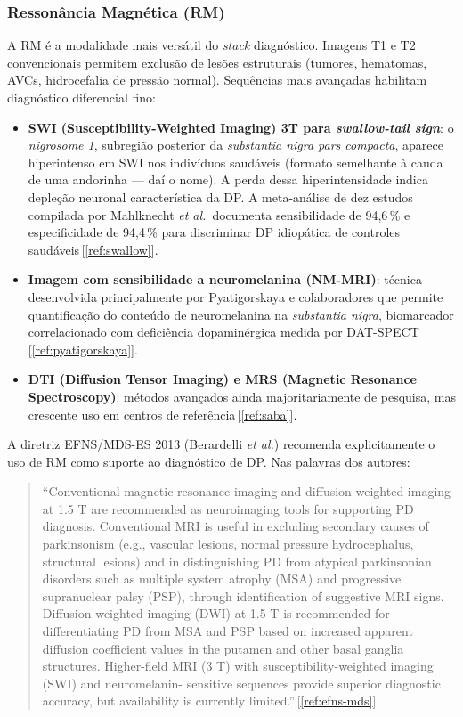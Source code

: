 \documentclass[12pt,a4paper,oneside]{article}
\begin{document}
\subsubsection{Ressonância Magnética (RM)}

A RM é a modalidade mais versátil do \textit{stack} diagnóstico.
Imagens T1 e T2 convencionais permitem exclusão de lesões
estruturais (tumores, hematomas, AVCs, hidrocefalia de pressão
normal). Sequências mais avançadas habilitam diagnóstico
diferencial fino:

\begin{itemize}
\item \textbf{SWI (Susceptibility-Weighted Imaging) 3T para
\textit{swallow-tail sign}}: o \textit{nigrosome 1}, subregião
posterior da \textit{substantia nigra pars compacta}, aparece
hiperintenso em SWI nos indivíduos saudáveis (formato semelhante
à cauda de uma andorinha — daí o nome). A perda dessa
hiperintensidade indica depleção neuronal característica da DP. A
meta-análise de dez estudos compilada por Mahlknecht \textit{et al.}\
documenta sensibilidade de 94,6\,\% e especificidade de 94,4\,\%
para discriminar DP idiopática de controles
saudáveis\,[\ref{ref:swallow}].
\item \textbf{Imagem com sensibilidade a neuromelanina
(NM-MRI)}: técnica desenvolvida principalmente por Pyatigorskaya e
colaboradores que permite quantificação do conteúdo de neuromelanina
na \textit{substantia nigra}, biomarcador correlacionado com
deficiência dopaminérgica medida por
DAT-SPECT\,[\ref{ref:pyatigorskaya}].
\item \textbf{DTI (Diffusion Tensor Imaging) e MRS (Magnetic
Resonance Spectroscopy)}: métodos avançados ainda majoritariamente
de pesquisa, mas crescente uso em centros de
referência\,[\ref{ref:saba}].
\end{itemize}

A diretriz EFNS/MDS-ES 2013 (Berardelli \textit{et al.}) recomenda
explicitamente o uso de RM como suporte ao diagnóstico de DP. Nas
palavras dos autores:

\begin{quotation}
\noindent\small
``Conventional magnetic resonance imaging and diffusion-weighted
imaging at 1.5 T are recommended as neuroimaging tools for
supporting PD diagnosis. Conventional MRI is useful in excluding
secondary causes of parkinsonism (e.g., vascular lesions, normal
pressure hydrocephalus, structural lesions) and in distinguishing
PD from atypical parkinsonian disorders such as multiple system
atrophy (MSA) and progressive supranuclear palsy (PSP), through
identification of suggestive MRI signs. Diffusion-weighted imaging
(DWI) at 1.5 T is recommended for differentiating PD from MSA and
PSP based on increased apparent diffusion coefficient values in the
putamen and other basal ganglia structures. Higher-field MRI (3 T)
with susceptibility-weighted imaging (SWI) and neuromelanin-
sensitive sequences provide superior diagnostic accuracy, but
availability is currently limited.''\,[\ref{ref:efns-mds}]
\end{quotation}
\end{document}
